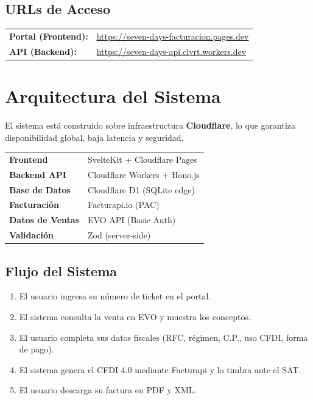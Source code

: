 \documentclass[11pt,a4paper]{article}
\begin{document}
\subsection*{URLs de Acceso}

\begin{tabularx}{\textwidth}{lX}
  \textbf{Portal (Frontend):} & \url{https://seven-days-facturacion.pages.dev} \\[4pt]
  \textbf{API (Backend):} & \url{https://seven-days-api.clvrt.workers.dev} \\
\end{tabularx}

\section*{Arquitectura del Sistema}

El sistema está construido sobre infraestructura \textbf{Cloudflare}, lo que garantiza disponibilidad global, baja latencia y seguridad.

\begin{tabularx}{\textwidth}{lX}
  \textbf{Frontend} & SvelteKit + Cloudflare Pages \\
  \textbf{Backend API} & Cloudflare Workers + Hono.js \\
  \textbf{Base de Datos} & Cloudflare D1 (SQLite edge) \\
  \textbf{Facturación} & Facturapi.io (PAC) \\
  \textbf{Datos de Ventas} & EVO API (Basic Auth) \\
  \textbf{Validación} & Zod (server-side) \\
\end{tabularx}

\subsection*{Flujo del Sistema}

\begin{enumerate}[leftmargin=1.5cm]
  \item El usuario ingresa su número de ticket en el portal.
  \item El sistema consulta la venta en EVO y muestra los conceptos.
  \item El usuario completa sus datos fiscales (RFC, régimen, C.P., uso CFDI, forma de pago).
  \item El sistema genera el CFDI 4.0 mediante Facturapi y lo timbra ante el SAT.
  \item El usuario descarga su factura en PDF y XML.
\end{enumerate}
\end{document}
